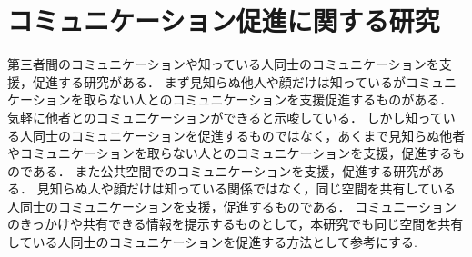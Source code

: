 \section{コミュニケーション促進に関する研究}\label{2.4}
第三者間のコミュニケーションや知っている人同士のコミュニケーションを支援，促進する研究がある．
まず見知らぬ他人や顔だけは知っているがコミュニケーションを取らない人とのコミュニケーションを支援促進するものがある\cite{hati}\cite{tikachat}\cite{compresence}\cite{siruetto}．
気軽に他者とのコミュニケーションができると示唆している．
しかし知っている人同士のコミュニケーションを促進するものではなく，あくまで見知らぬ他者やコミュニケーションを取らない人とのコミュニケーションを支援，促進するものである．
また公共空間でのコミュニケーションを支援，促進する研究がある\cite{komyusoku}\cite{travelingcafe}\cite{meetingpot}\cite{photochat}．
見知らぬ人や顔だけは知っている関係ではなく，同じ空間を共有している人同士のコミュニケーションを支援，促進するものである．
コミュニーションのきっかけや共有できる情報を提示するものとして，本研究でも同じ空間を共有している人同士のコミュニケーションを促進する方法として参考にする.



